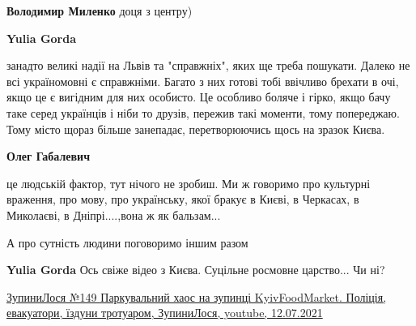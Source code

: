 \begin{itemize}
\begin{itemize}
 
\textbf{Володимир Миленко} доця з центру)

 
\textbf{Yulia Gorda} 

занадто великі надії на Львів та "справжніх", яких ще треба пошукати. Далеко не
всі україномовні є справжніми. Багато з них готові тобі ввічливо брехати в очі,
якщо це є вигідним для них особисто. Це особливо боляче і гірко, якщо бачу таке
серед українців і ніби то друзів, пережив такі моменти, тому попереджаю. Тому
місто щораз більше занепадає, перетворюючись щось на зразок Києва.


 
\textbf{Олег Габалевич} 

це людській фактор, тут нічого не зробиш. Ми ж говоримо про культурні враження,
про мову, про українську, якої бракує в Києві, в Черкасах, в Миколаєві, в
Дніпрі....,вона ж як бальзам...

А про сутність людини поговоримо іншим разом

 
\textbf{Yulia Gorda} Ось свіже відео з Києва. Суцільне росмовне царство... Чи ні?

\href{https://www.youtube.com/watch?v=XEfe01vlikE}{%
ЗупиниЛося №149 Паркувальний хаос на зупинці KyivFoodMarket. Поліція, евакуатори, їздуни тротуаром, %
ЗупиниЛося, youtube, 12.07.2021%
}

\end{itemize}


\end{itemize}
